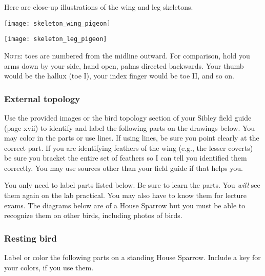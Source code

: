 \documentclass[10pt]{article}
\begin{document}
Here are close-up illustrations of the wing and leg skeletons. 

\texttt{[image: skeleton\_wing\_pigeon]}

\vfill

\begin{center}
	\texttt{[image: skeleton\_leg\_pigeon]}
\end{center}

\textsc{Note:} toes are numbered from the midline outward. For comparison, hold you arms down by your side, hand open, palms directed backwards. Your thumb would be the hallux (toe I), your index finger would be toe II, and so on.

\newpage

\subsubsection*{External topology}

Use the provided images or the bird topology section of your Sibley field guide (page xvii) to identify and label the following parts on the drawings below. You may color in the parts or use lines. If using lines, be sure you point clearly at the correct part. If you are identifying feathers of the wing (e.g., the lesser coverts) be sure you bracket the entire set of feathers so I can tell you identified them correctly. You may use sources other than your field guide if that helps you. 
 
You only need to label parts listed below. Be sure to learn the parts. You \emph{will} see them again on the lab practical. You may also have to know them for lecture exams. The diagrams below are of a House Sparrow but you must be able to recognize them on other birds, including photos of birds.
 


\subsubsection*{Resting bird}

Label or color the following parts on a standing House Sparrow. Include a key for your colors, if you use them.
\end{document}
